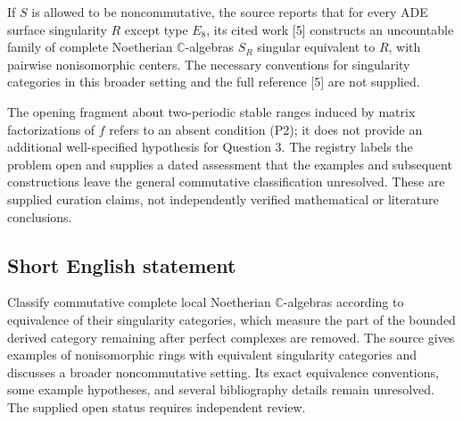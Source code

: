 \documentclass[11pt]{article}
\newcommand{\C}{\mathbb{C}}
\begin{document}
If \(S\) is allowed to be noncommutative, the source reports that for every ADE surface singularity \(R\) except type \(E_8\), its cited work [5] constructs an uncountable family of complete Noetherian \(\C\)-algebras \(S_R\) singular equivalent to \(R\), with pairwise nonisomorphic centers. The necessary conventions for singularity categories in this broader setting and the full reference [5] are not supplied.

The opening fragment about two-periodic stable ranges induced by matrix factorizations of \(f\) refers to an absent condition (P2); it does not provide an additional well-specified hypothesis for Question 3. The registry labels the problem open and supplies a dated assessment that the examples and subsequent constructions leave the general commutative classification unresolved. These are supplied curation claims, not independently verified mathematical or literature conclusions.
\subsection{Short English statement}
Classify commutative complete local Noetherian \(\C\)-algebras according to equivalence of their singularity categories, which measure the part of the bounded derived category remaining after perfect complexes are removed. The source gives examples of nonisomorphic rings with equivalent singularity categories and discusses a broader noncommutative setting. Its exact equivalence conventions, some example hypotheses, and several bibliography details remain unresolved. The supplied open status requires independent review.
\end{document}
